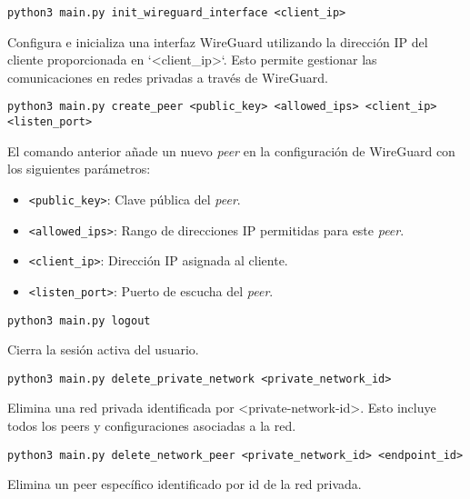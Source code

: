     \begin{Verbatim}[breaklines=true]
    python3 main.py init_wireguard_interface <client_ip>
    \end{Verbatim}
    Configura e inicializa una interfaz WireGuard utilizando la dirección IP del cliente proporcionada en `<client\_ip>`. Esto permite gestionar las comunicaciones en redes privadas a través de WireGuard.
    
   
    
    \begin{Verbatim}[breaklines=true]
        python3 main.py create_peer <public_key> <allowed_ips> <client_ip> <listen_port>
        \end{Verbatim}
        
        El comando anterior añade un nuevo \textit{peer} en la configuración de WireGuard con los siguientes parámetros:  
        \begin{itemize}
            \item \texttt{<public\_key>}: Clave pública del \textit{peer}.
            \item \texttt{<allowed\_ips>}: Rango de direcciones IP permitidas para este \textit{peer}.
            \item \texttt{<client\_ip>}: Dirección IP asignada al cliente.
            \item \texttt{<listen\_port>}: Puerto de escucha del \textit{peer}.
        \end{itemize}     
   
    \begin{Verbatim}[breaklines=true]
        python3 main.py logout
    \end{Verbatim}
    Cierra la sesión activa del usuario. 
    
    \begin{Verbatim}[breaklines=true]
        python3 main.py delete_private_network <private_network_id>
    \end{Verbatim}
    Elimina una red privada identificada por <private-network-id>. Esto incluye todos los peers y configuraciones asociadas a la red.
    
    \begin{Verbatim}[breaklines=true]
        python3 main.py delete_network_peer <private_network_id> <endpoint_id>
    \end{Verbatim}
    Elimina un peer específico identificado por id de la red privada.
    
